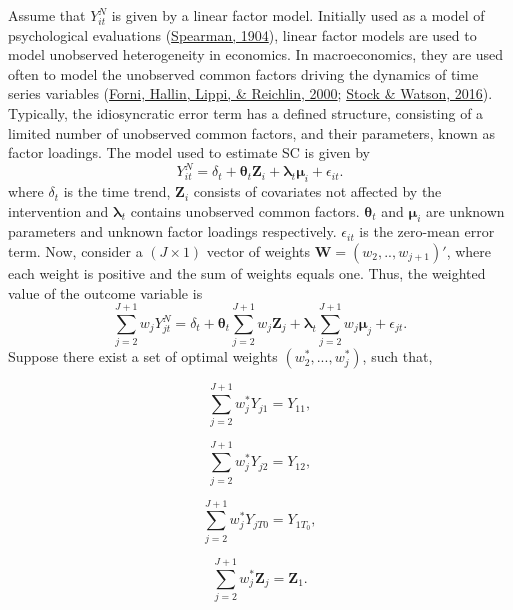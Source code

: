 \documentclass[12pt,nobind, a4paper]{reedthesis}
\begin{document}
 Assume that \(Y^{N}_{it}\) is given by a linear factor model. Initially used as a model of psychological evaluations (\protect\hyperlink{ref-spearman_general_1904}{Spearman, 1904}), linear factor models are used to model unobserved heterogeneity in economics. In macroeconomics, they are used often to model the unobserved common factors driving the dynamics of time series variables (\protect\hyperlink{ref-forni_generalized_2000}{Forni, Hallin, Lippi, \& Reichlin, 2000}; \protect\hyperlink{ref-stock_dynamic_2016}{Stock \& Watson, 2016}). Typically, the idiosyncratic error term has a defined structure, consisting of a limited number of unobserved common factors, and their parameters, known as factor loadings. The model used to estimate SC is given by
 \begin{equation}
 Y^{N}_{it}= \delta_{t}+\boldsymbol{\theta}_{t}\mathbf{Z}_{i}+\boldsymbol{\lambda}_{t} \boldsymbol{\mu}_{i}+ \epsilon_{it}.
 \label{eq:eq4}
 \end{equation}
 where \(\delta_{t}\) is the time trend, \(\mathbf{Z}_{i}\) consists of covariates not affected by the intervention and \(\boldsymbol{\lambda}_{t}\) contains unobserved common factors. \(\boldsymbol{\theta}_{t}\) and \(\boldsymbol{\mu}_{i}\) are unknown parameters and unknown factor loadings respectively. \(\epsilon_{it}\) is the zero-mean error term. Now, consider a \((J\times 1)\) vector of weights \(\mathbf{W}=(w_{2},..,w_{j+1})'\), where each weight is positive and the sum of weights equals one. Thus, the weighted value of the outcome variable is
 \begin{equation}
 \sum_{j=2}^{J+1}w_{j}Y^{N}_{jt}= \delta_{t}+\boldsymbol{\theta}_{t}\sum_{j=2}^{J+1}w_{j}\mathbf{Z}_{j}+\boldsymbol{\lambda}_{t}\sum_{j=2}^{J+1}w_{j}\boldsymbol{\mu}_{j}+\epsilon_{jt}.
 \label{eq:eq5}
 \end{equation}
 Suppose there exist a set of optimal weights \((w_{2}^{*},...,w_{j}^{*})\), such that,

 \[\sum_{j=2}^{J+1}w_{j}^{*}Y_{j1}=Y_{11},\]

 \[ \sum_{j=2}^{J+1}w_{j}^{*}Y_{j2}=Y_{12},\]

 \[\sum_{j=2}^{J+1}w_{j}^{*}Y_{jT0}=Y_{1T_0},\]

 \[\sum_{j=2}^{J+1}w_{j}^{*} \mathbf{Z}_{j}=\mathbf{Z}_{1}.\]
\end{document}
